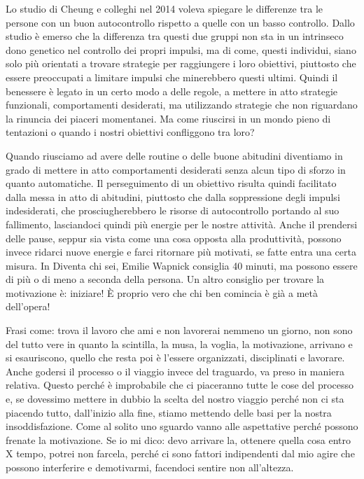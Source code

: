 \documentclass[12pt]{book} %
\begin{document}
\begin{mdframed}[linewidth=1pt]
Lo studio di Cheung e colleghi nel 2014 voleva spiegare le differenze tra le persone con un buon autocontrollo rispetto
a quelle con un basso controllo. Dallo studio è emerso che la differenza tra questi due gruppi non sta in un intrinseco
dono genetico nel controllo dei propri impulsi, ma di come, questi individui, siano solo più orientati a trovare
strategie per raggiungere i loro obiettivi, piuttosto che essere preoccupati a limitare impulsi che minerebbero questi
ultimi. Quindi il benessere è legato in un certo modo a delle regole, a mettere in atto strategie funzionali,
comportamenti desiderati, ma utilizzando strategie che non riguardano la rinuncia dei piaceri momentanei. Ma come
riuscirsi in un mondo pieno di tentazioni o quando i nostri obiettivi confliggono tra loro? 

Quando riusciamo ad avere delle routine o delle buone abitudini diventiamo in grado di mettere in atto comportamenti
desiderati senza alcun tipo di sforzo in quanto automatiche. Il perseguimento di un obiettivo risulta quindi facilitato
dalla messa in atto di abitudini, piuttosto che dalla soppressione degli impulsi indesiderati, che prosciugherebbero le
risorse di autocontrollo portando al suo fallimento, lasciandoci quindi più energie per le nostre
attività. Anche il prendersi delle pause, seppur
sia vista come una cosa opposta alla produttività, possono invece ridarci nuove energie e farci ritornare più motivati,
se fatte entra una certa misura. In Diventa chi sei, Emilie Wapnick
consiglia 40 minuti, ma possono essere di più o di meno a seconda della persona. Un altro consiglio per trovare la
motivazione è: iniziare! È proprio vero che chi ben comincia è già a metà dell'opera! 

Frasi come: trova il lavoro che ami e non lavorerai nemmeno un giorno, non sono del tutto vere in quanto la scintilla,
la musa, la voglia, la motivazione, arrivano e si esauriscono, quello che resta poi è l'essere organizzati,
disciplinati e lavorare. Anche godersi il processo o il viaggio invece del traguardo, va preso in maniera relativa.
Questo perché è improbabile che ci piaceranno tutte le cose del processo e, se dovessimo mettere in dubbio la scelta
del nostro viaggio perché non ci sta piacendo tutto, dall'inizio alla fine, stiamo mettendo delle
basi per la nostra insoddisfazione. Come al solito uno sguardo vanno alle aspettative perché possono frenate la
motivazione. Se io mi dico: devo arrivare la, ottenere quella cosa entro X tempo, potrei non farcela, perché ci sono
fattori indipendenti dal mio agire che possono interferire e demotivarmi, facendoci sentire non all'altezza.


\end{mdframed}
\end{document}
